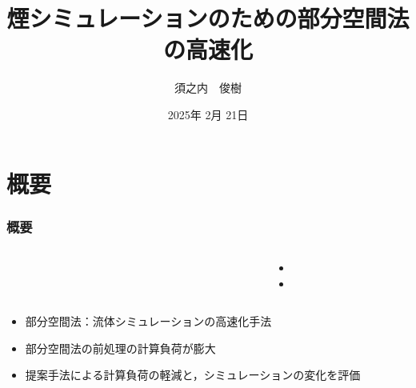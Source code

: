 \documentclass[aspectratio=169,dvipdfmx,hyperref={bookmarks=true}]{beamer}
\title{煙シミュレーションのための部分空間法の高速化}
\author{須之内　俊樹}
\institute{中央大学理工学研究科　情報工学専攻　\\形状情報処理研究室　23N8100018B}
\date{2025年 2月 21日}
\begin{document}
   \begin{frame}
 \maketitle
 \end{frame} 
  
     \section{概要}
 \begin{frame}
 \frametitle{概要}
 \begin{columns}[]
	\begin{column}{0.3\linewidth}
	\end{column}
	\begin{column}{0.3\linewidth}
    \end{column}

	\begin{column}{0.35\linewidth}
	  \begin{block}{}
  		\begin{itemize}
			\item 
			\item 
		\end{itemize}
	\end{block}
    \end{column}
   \end{columns}

  \begin{block}{}
  \begin{itemize}
	\item 部分空間法：流体シミュレーションの高速化手法
	\item 部分空間法の前処理の計算負荷が膨大
	\item 提案手法による計算負荷の軽減と，シミュレーションの変化を評価
\end{itemize}
\end{block}

 \end{frame}
\end{document}
